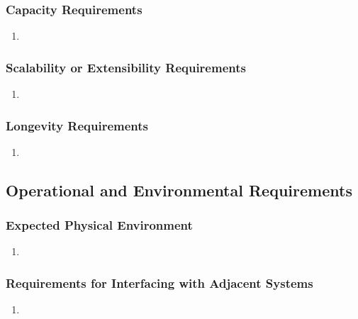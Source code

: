\documentclass[]{article}
\begin{document}
\subsubsection{Capacity Requirements}
\label{ssub:capacity_requirements}
\begin{enumerate}[{PR-C}1. ]
	\item 
\end{enumerate}

\subsubsection{Scalability or Extensibility Requirements}
\label{ssub:scalability_or_extensibility_requirements}
\begin{enumerate}[{PR-SE}1. ]
	\item 
\end{enumerate}

\subsubsection{Longevity Requirements}
\label{ssub:longevity_requirements}
\begin{enumerate}[{PR-L}1. ]
	\item 
\end{enumerate}


\subsection{Operational and Environmental Requirements}
\label{sub:operational_and_environmental_requirements}

\subsubsection{Expected Physical Environment}
\label{ssub:expected_physical_environment}
\begin{enumerate}[{OE-EPE}1. ]
	\item 
\end{enumerate}

\subsubsection{Requirements for Interfacing with Adjacent Systems}
\label{ssub:requirements_for_interfacing_with_adjacent_systems}
\begin{enumerate}[{OE-IA}1. ]
	\item 
\end{enumerate}
\end{document}
